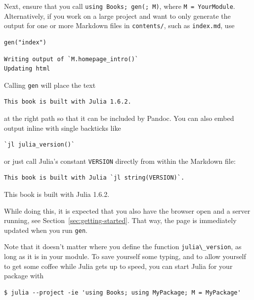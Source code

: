 \documentclass[
  14pt
  american,
  paper=a4,
  ,captions=tableheading
]{scrreprt}
\newcommand{\passthrough}[1]{#1}
\begin{document}
Next, ensure that you call
\passthrough{\lstinline!using Books; gen(; M)!}, where
\passthrough{\lstinline!M = YourModule!}. Alternatively, if you work on
a large project and want to only generate the output for one or more
Markdown files in \passthrough{\lstinline!contents/!}, such as
\passthrough{\lstinline!index.md!}, use

\begin{lstlisting}
gen("index")
\end{lstlisting}

\begin{lstlisting}
Writing output of `M.homepage_intro()`
Updating html
\end{lstlisting}

Calling \passthrough{\lstinline!gen!} will place the text

\begin{lstlisting}
This book is built with Julia 1.6.2.
\end{lstlisting}

at the right path so that it can be included by Pandoc. You can also
embed output inline with single backticks like

\begin{lstlisting}
`jl julia_version()`
\end{lstlisting}

or just call Julia's constant \passthrough{\lstinline!VERSION!} directly
from within the Markdown file:

\begin{lstlisting}
This book is built with Julia `jl string(VERSION)`.
\end{lstlisting}

This book is built with Julia 1.6.2.

While doing this, it is expected that you also have the browser open and
a server running, see Section~\ref{sec:getting-started}. That way, the
page is immediately updated when you run \passthrough{\lstinline!gen!}.

Note that it doesn't matter where you define the function
\passthrough{\lstinline!julia\_version!}, as long as it is in your
module. To save yourself some typing, and to allow yourself to get some
coffee while Julia gets up to speed, you can start Julia for your
package with

\begin{lstlisting}
$ julia --project -ie 'using Books; using MyPackage; M = MyPackage'
\end{lstlisting}
\end{document}
